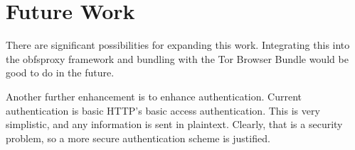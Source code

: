 \section{Future Work}

There are significant possibilities for expanding this work. 
Integrating this into the obfsproxy framework and bundling with the Tor Browser Bundle would be good to do in the future.

Another further enhancement is to enhance authentication. Current authentication is basic HTTP's basic access authentication. This is very simplistic, and any information is sent in plaintext. Clearly, that is a security problem, so a more secure authentication scheme is justified.


